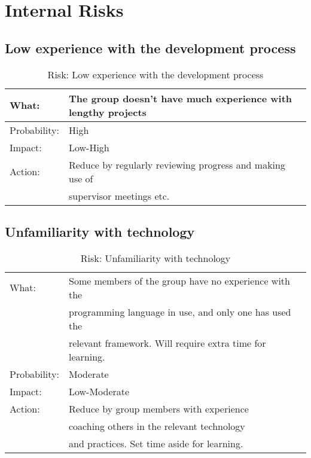 
\section{Internal Risks}
\subsection{Low experience with the development process}
\begin{table}[H]
\begin{tabular}{| l | l |}
	\hline
	What: & The group doesn't have much experience with lengthy projects\\
	\hline
	Probability: & High \\
	\hline
	Impact: & Low-High \\
	\hline
	Action: & Reduce by regularly reviewing progress and making use of \\
			& supervisor meetings etc.\\
	\hline
\end{tabular}
\caption{Risk: Low experience with the development process}
\end{table}

\subsection{Unfamiliarity with technology}
\begin{table}[H]
\begin{tabular}{| l | l |}
	\hline
	What: & Some members of the group have no experience with the \\
		& programming language in use, and only one has used the \\
		& relevant framework. Will require extra time for learning.\\
	\hline
	Probability: & Moderate \\
	\hline
	Impact: & Low-Moderate \\
	\hline
	Action: & Reduce by group members with experience \\
	& coaching others in the relevant technology\\
	& and practices. Set time aside for learning.\\
	\hline
\end{tabular}
\caption{Risk: Unfamiliarity with technology}
\end{table}

